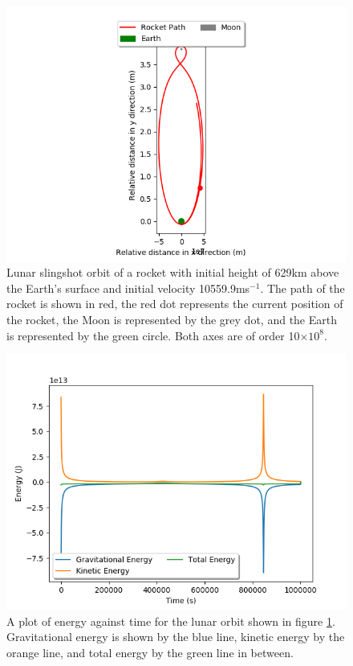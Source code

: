 \documentclass[twocolumn,prl,nobalancelastpage,aps,10pt]{revtex4-1}
\begin{document}
\begin{figure}[ht]
	\includegraphics*[width=0.96\linewidth,clip]{moonFoE}
	\caption{Lunar slingshot orbit of a rocket with initial height of 629km above the Earth's surface and initial velocity 10559.9ms$^{-1}$. The path of the rocket is shown in red, the red dot represents the current position of the rocket, the Moon is represented by the grey dot, and the Earth is represented by the green circle. Both axes are of order 10$\times10^{8}$.} \label{moonFoEFig}
\end{figure}

\begin{figure}[ht]
	\includegraphics*[width=0.96\linewidth,clip]{moonFoEEnergy}
	\caption{A plot of energy against time for the lunar orbit shown in figure \ref{moonFoEFig}. Gravitational energy is shown by the blue line, kinetic energy by the orange line, and total energy by the green line in between.} \label{moonFoEEn}
\end{figure}
\end{document}

